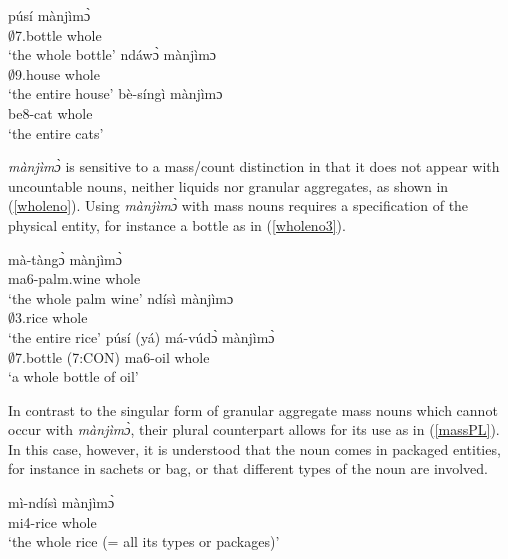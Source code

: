 \begin{exe}
\ex\label{whole}
\begin{xlist}
\ex \label{whole1}
  \gll     púsí mànjìmɔ̀\\
                $\emptyset$7.bottle whole \\
    \trans `the whole bottle'
\ex\label{whole2}
 \gll     ndáwɔ̀ mànjìmɔ  \\
             $\emptyset$9.house whole  \\
    \trans `the entire house'
\ex\label{whole3}
 \gll   bè-síngì mànjìmɔ  \\
             be8-cat whole   \\
    \trans `the entire cats'
\end {xlist}
\end {exe}

{\itshape mànjìmɔ̀} is sensitive to a mass/count distinction in that it does not appear with uncountable nouns, neither liquids nor granular aggregates, as shown in (\ref{wholeno}). Using {\itshape mànjìmɔ̀} with mass nouns requires a specification of the physical entity, for instance a bottle as in (\ref{wholeno3}).

\begin{exe}
\ex\label{wholeno}
\begin{xlist}
\ex \label{wholeno1}
  \gll     *mà-tàngɔ̀ mànjìmɔ̀\\
                ma6-palm.wine whole \\
    \trans `the whole palm wine'
\ex\label{wholeno2}
 \gll     *ndísì mànjìmɔ  \\
             $\emptyset$3.rice whole  \\
    \trans `the entire rice'
\ex \label{wholeno3}
  \gll     púsí (yá) má-vúdɔ̀ mànjìmɔ̀\\
                $\emptyset$7.bottle (7:CON) ma6-oil whole \\
    \trans `a whole bottle of oil'
\end {xlist}
\end {exe}

\noindent In contrast to the singular form of granular aggregate mass nouns which cannot occur with {\itshape mànjìmɔ̀}, their plural counterpart allows for its use as in (\ref{massPL}). In this case, however, it is understood that the noun comes in packaged entities, for instance in sachets or bag, or that different types of the noun are involved.

\begin{exe}
\ex\label{massPL}
  \gll     mì-ndísì mànjìmɔ̀ \\
                mi4-rice whole \\
    \trans `the whole rice (= all its types or packages)'
\end {exe}








